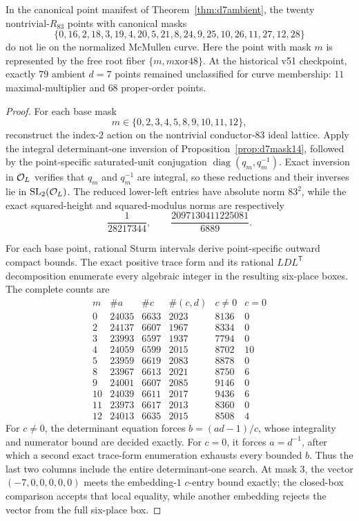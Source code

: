 \begin{proposition}[A twenty-point proper-order $d=7$ exclusion batch]\label{prop:d7batch10}
In the canonical point manifest of Theorem~\ref{thm:d7ambient}, the twenty
nontrivial-$R_{83}$ points with canonical masks
\[
 \{0,16,2,18,3,19,4,20,5,21,8,24,9,25,10,26,11,27,12,28\}
\]
do not lie on the normalized McMullen curve.  Here the point with mask $m$
is represented by the free root fiber $\{m,m\mathbin{\mathrm{xor}}48\}$.
At the historical v51 checkpoint, exactly $79$ ambient $d=7$ points
remained unclassified for curve membership: $11$ maximal-multiplier and $68$ proper-order points.
\end{proposition}
\begin{proof}
For each base mask
\[
 m\in\{0,2,3,4,5,8,9,10,11,12\},
\]
reconstruct the index-$2$ action on the nontrivial conductor-$83$ ideal
lattice. Apply the integral determinant-one inversion of
Proposition~\ref{prop:d7mask14}, followed by the point-specific saturated-unit
conjugation $\operatorname{diag}(q_m,q_m^{-1})$. Exact inversion in
$\mathcal O_L$ verifies that $q_m$ and $q_m^{-1}$ are integral, so these reductions and
their inverses lie in $\operatorname{SL}_2(\mathcal O_L)$. The reduced lower-left entries have
absolute norm $83^2$, while the exact squared-height and squared-modulus norms
are respectively
\[
 \frac1{28217344},\qquad
 \frac{2097130411225081}{6889}.
\]

For each base point, rational Sturm intervals derive point-specific outward
compact bounds. The exact positive trace form and its rational
$LDL^{\mathsf T}$ decomposition enumerate every algebraic integer in the
resulting six-place boxes. The complete counts are
\[
\begin{array}{c|rrrrr}
m&\#a&\#c&\#(c,d)&c\ne0&c=0\\ \hline
0 &24035&6633&2023&8136&0\\
2 &24137&6607&1967&8334&0\\
3 &23993&6597&1937&7794&0\\
4 &24059&6599&2015&8702&10\\
5 &23959&6619&2083&8878&0\\
8 &23967&6613&2021&8750&6\\
9 &24001&6607&2085&9146&0\\
10&24039&6611&2017&9436&6\\
11&23973&6617&2013&8360&0\\
12&24013&6635&2015&8508&4
\end{array}
\]
For $c\ne0$, the determinant equation forces $b=(ad-1)/c$, whose
integrality and numerator bound are decided exactly. For $c=0$, it forces
$a=d^{-1}$, after which a second exact trace-form enumeration exhausts every
bounded $b$. Thus the last two columns include the entire determinant-one
search. At mask $3$, the vector $(-7,0,0,0,0,0)$ meets the embedding-$1$
$c$-entry bound exactly; the closed-box comparison accepts that local
equality, while another embedding rejects the vector from the full six-place
box.


\end{proof}
